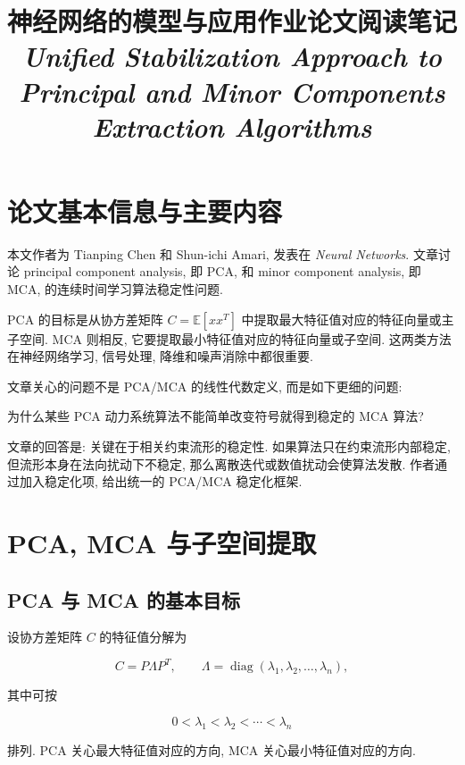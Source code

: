 \documentclass[oneside]{ctexart}
\title{神经网络的模型与应用作业论文阅读笔记\\[0.6ex]
\large \textit{Unified Stabilization Approach to Principal and Minor Components Extraction Algorithms}}
\author{}
\date{}
\DeclareMathOperator{\diag}{diag}
\begin{document}
\maketitle

\section{论文基本信息与主要内容}

本文作者为 Tianping Chen 和 Shun-ichi Amari, 发表在 \textit{Neural Networks}. 文章讨论 principal component analysis, 即 PCA, 和 minor component analysis, 即 MCA, 的连续时间学习算法稳定性问题.

PCA 的目标是从协方差矩阵 $C=\mathbb{E}[xx^T]$ 中提取最大特征值对应的特征向量或主子空间. MCA 则相反, 它要提取最小特征值对应的特征向量或子空间. 这两类方法在神经网络学习, 信号处理, 降维和噪声消除中都很重要.

文章关心的问题不是 PCA/MCA 的线性代数定义, 而是如下更细的问题:

\begin{center}
    为什么某些 PCA 动力系统算法不能简单改变符号就得到稳定的 MCA 算法?
\end{center}

文章的回答是: 关键在于相关约束流形的稳定性. 如果算法只在约束流形内部稳定, 但流形本身在法向扰动下不稳定, 那么离散迭代或数值扰动会使算法发散. 作者通过加入稳定化项, 给出统一的 PCA/MCA 稳定化框架.

\section{PCA, MCA 与子空间提取}

\subsection{PCA 与 MCA 的基本目标}

设协方差矩阵 $C$ 的特征值分解为

\begin{equation}
    C=P\Lambda P^T,
    \qquad
    \Lambda=\diag(\lambda_1,\lambda_2,\dots,\lambda_n),
\end{equation}

其中可按

\begin{equation}
    0<\lambda_1<\lambda_2<\cdots<\lambda_n
\end{equation}

排列. PCA 关心最大特征值对应的方向, MCA 关心最小特征值对应的方向.
\end{document}
